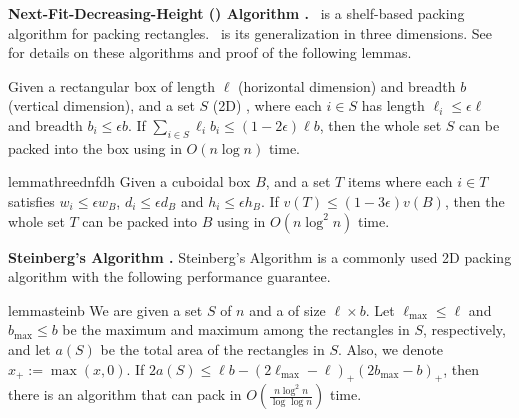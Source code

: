 
\noindent \textbf{Next-Fit-Decreasing-Height (\NFDH) Algorithm \cite{coffman1980performance}.}
\NFDH~is a shelf-based packing algorithm for packing rectangles. \tNFDH~is its generalization in three dimensions.
See  for details on these algorithms and proof of the following lemmas.

\begin{lemma}
\label{lem:2d-hfdh}
    Given a rectangular box of length $\ell$ (horizontal dimension) and breadth $b$ (vertical dimension), 
    and a set $S$  (2D) , where each $i\in S$ has length $\ell_i \le \epsilon\ell$ 
    and breadth $b_i \le \epsilon b$. If $\sum_{i\in S} \ell_i b_i \le (1-2\epsilon)\ell b$, then the whole set $S$ can be packed into the box using \NFDH in $O(n \log n)$ time.
\end{lemma}

\begin{restatable}{lemma}{threednfdh}
\label{lem:3d-hfdh}
    Given a cuboidal box $B$, and a set $T$  items where each $i\in T$ satisfies $w_i\le \epsilon w_B$, $d_i \le \epsilon d_B$ and $h_i \le \epsilon h_B$. If $v(T) \le (1-3\epsilon)v(B)$, then the whole set $T$ can be packed into $B$ using \tNFDH in $O(n \log^2 n)$ time.
\end{restatable}


\noindent \textbf{Steinberg's Algorithm \cite{steinberg}.} 
Steinberg's Algorithm is a commonly used 2D packing algorithm with the following performance guarantee.
\begin{restatable}{lemma}{steinb}
\label{lem:stein}
We are given a set $S$ of $n$  and a  of size $\ell \times b$. 
Let $\ell_{\max} \le \ell$ and $b_{\max} \le b$ be the maximum
 and maximum  among the rectangles in $S$, respectively, and let
$a(S)$ be the total area of the rectangles in $S$. Also, we denote $x_+:=
\max(x, 0)$. 
If
$2a(S) \le \ell b - (2\ell_{\max} - \ell)_+(2b_{\max}-b)_+$,
then there is an algorithm that can pack  in $O\left(\frac{n \log^2 n}{\log \log n}\right)$ time.
\end{restatable}

